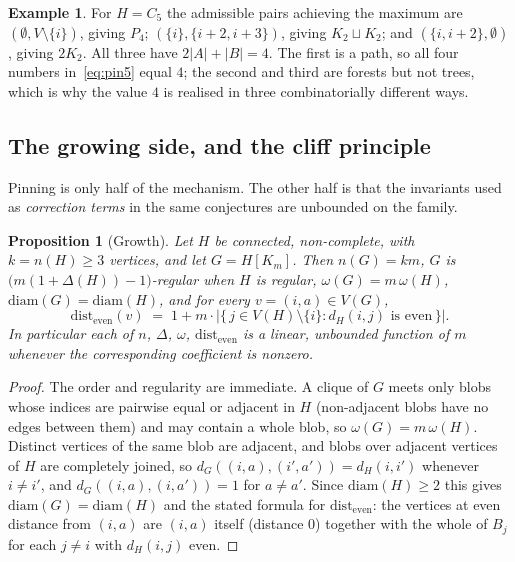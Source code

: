 \documentclass[10pt,a4paper]{article}
\theoremstyle{plain}
\newtheorem{proposition}[theorem]{Proposition}
\theoremstyle{definition}
\newtheorem{example}[theorem]{Example}
\newcommand{\de}{\mathrm{dist_{even}}}
\begin{document}
\begin{example}
For $H = C_5$ the admissible pairs achieving the maximum are $(\emptyset, V \setminus \{i\})$,
giving $P_4$; $(\{i\}, \{i+2,i+3\})$, giving $K_2 \sqcup K_2$; and $(\{i,i+2\}, \emptyset)$,
giving $2K_2$. All three have $2|A| + |B| = 4$. The first is a path, so all four numbers
in~\eqref{eq:pin5} equal $4$; the second and third are forests but not trees, which is why the
value $4$ is realised in three combinatorially different ways.
\end{example}

\subsection{The growing side, and the cliff principle}

Pinning is only half of the mechanism. The other half is that the invariants used as
\emph{correction terms} in the same conjectures are unbounded on the family.

\begin{proposition}[Growth]\label{prop:growth}
Let $H$ be connected, non-complete, with $k = n(H) \ge 3$ vertices, and let $G = H[K_m]$. Then
$n(G) = km$, $G$ is $\big(m(1+\Delta(H)) - 1\big)$-regular when $H$ is regular,
$\omega(G) = m\,\omega(H)$, $\mathrm{diam}(G) = \mathrm{diam}(H)$, and for every
$v = (i,a) \in V(G)$,
\[
\de(v) \;=\; 1 + m\cdot\big|\{\, j \in V(H)\setminus\{i\} : d_H(i,j) \text{ is even} \,\}\big| .
\]
In particular each of $n$, $\Delta$, $\omega$, $\de$ is a linear, unbounded function of $m$
whenever the corresponding coefficient is nonzero.
\end{proposition}

\begin{proof}
The order and regularity are immediate. A clique of $G$ meets only blobs whose indices are
pairwise equal or adjacent in $H$ (non-adjacent blobs have no edges between them) and may
contain a whole blob, so $\omega(G) = m\,\omega(H)$. Distinct vertices of the same blob are
adjacent, and blobs over adjacent vertices of $H$ are completely joined, so
$d_G((i,a),(i',a')) = d_H(i,i')$ whenever $i \ne i'$, and $d_G((i,a),(i,a')) = 1$ for
$a \ne a'$. Since $\mathrm{diam}(H) \ge 2$ this gives $\mathrm{diam}(G) = \mathrm{diam}(H)$ and
the stated formula for $\de$: the vertices at even distance from $(i,a)$ are $(i,a)$ itself
(distance $0$) together with the whole of $B_j$ for each $j \ne i$ with $d_H(i,j)$ even.
\end{proof}
\end{document}
